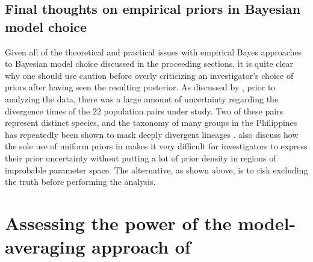 \documentclass[letterpaper,12pt]{article}
\begin{document}
\begin{linenumbers}
\subsection*{Final thoughts on empirical priors in Bayesian model choice}
Given all of the theoretical and practical issues with empirical Bayes
approaches to Bayesian model choice discussed in the proceeding sections, it is
quite clear why one should use caution before overly criticizing an
investigator's choice of priors after having seen the resulting posterior.
As discussed by \citet{Oaks2012}, prior to analyzing the data, there was a large
amount of uncertainty regarding the divergence times of the 22 population pairs
under study.
Two of these pairs represent distinct species, and the taxonomy of many groups
in the Philippines has repeatedly been shown to mask deeply divergent lineages
\citep{RafeDiesmosAlcala2008,Linkem2010,Siler2010,Welton2010,Siler2011HerpMonographs,
    Siler2011,Siler2012,RafeStuart2012,LinkemBrown2013}.
\citet{Oaks2012} also discuss how the sole use of uniform priors in \msb makes
it very difficult for investigators to express their prior uncertainty without
putting a lot of prior density in regions of improbable parameter space.
The alternative, as shown above, is to risk excluding the truth before
performing the analysis.






\section*{Assessing the power of the model-averaging approach of
    \citet{Hickerson2013}}


\end{linenumbers}
\end{document}

